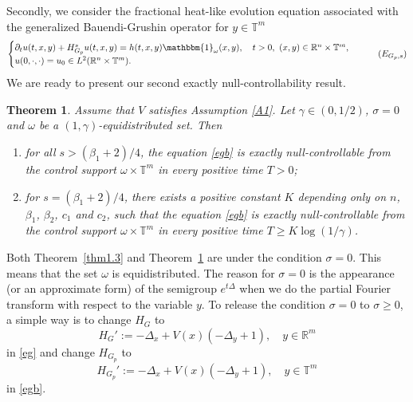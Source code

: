 \documentclass{article}
\numberwithin{equation}{section}
\renewcommand{\d}{\,\mathrm{d}}
\newcommand\N{\ensuremath{\mathbb{N}}}
\newcommand\R{\ensuremath{\mathbb{R}}}
\newcommand\T{\ensuremath{\mathbb{T}}}
\newtheorem{theorem}{Theorem}[section]
\numberwithin{equation}{section}
\theoremstyle{definition}
\begin{document}
Secondly, we consider the fractional heat-like evolution equation associated with the generalized Bauendi-Grushin operator for $y \in \T^{m}$
\begin{equation}\label{egb}
	\begin{cases}
		\partial_t u(t,x,y)+H^{s}_{G_p} u(t,x,y)=h(t,x,y)\mathbbm{1}_{\omega}(x,y),\quad t>0,\,\, (x,y)\in \R^{n}\times \T^{m},\\
		u(0,\cdot ,\cdot )=u_0\in L^2(\R^{n}\times \T^{m}).
	\end{cases}\tag{$E_{G_p,s}$}
\end{equation}
We are ready to present our second exactly null-controllability result.
\begin{theorem}\label{thm1.4}
	Assume that $V$ satisfies Assumption \ref{A1}. Let $\gamma \in (0,1 /2)$, $\sigma = 0$ and $\omega$ be a $(1,\gamma)$-equidistributed set. Then 
\begin{enumerate}
	\item for all $ s> (\beta_1+2) /{4} $, the equation \eqref{egb} is exactly null-controllable from the control support $\omega\times \T^{m}$ in every positive time $T>0$;
	\item for $s =(\beta_1+2) /{4} $, there exists a positive constant $K$ depending only on $n$, $\beta_1$, $\beta_2$, $c_1$ and $c_2$, such that the equation \eqref{egb} is exactly null-controllable from the control support $\omega\times \T^{m}$ in every positive time $T\ge K \log(1 /\gamma)$.
\end{enumerate}
\end{theorem}



Both Theorem~\ref{thm1.3} and Theorem~\ref{thm1.4} are under the condition $\sigma =0$. This means that the set $\omega$ is equidistributed. The reason for $\sigma =0$ is the appearance (or an approximate form) of the semigroup $e^{t\Delta}$ when we do the partial Fourier transform with respect to the variable $y$. To release the condition $\sigma = 0$ to $\sigma \ge 0$, a simple way is to change $H_{G}$ to  
\[
H_{G}':= -\Delta_x+V(x)\left( -\Delta_y+1 \right),\quad y \in \R^{m} 
\] 
in \eqref{eg} and change $H_{G_p}$ to 
\[
H_{G_p}':=-\Delta_x+V(x)\left( -\Delta_y+1 \right),\quad y\in \T ^{m} 
\] in \eqref{egb}. 
\end{document}
